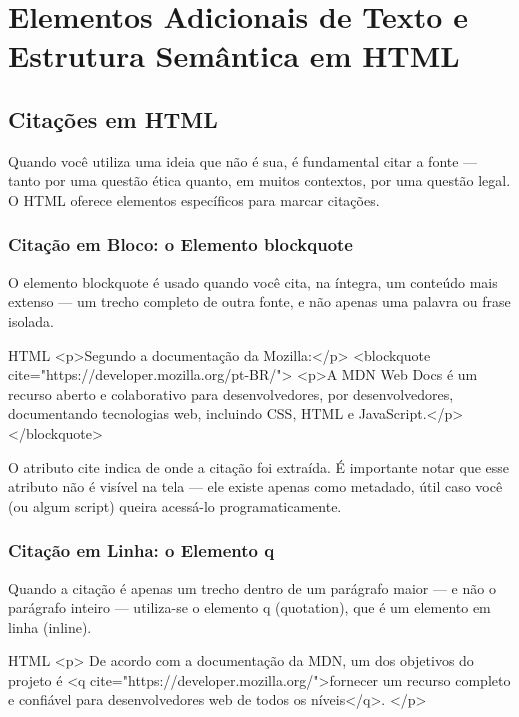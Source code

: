 \chapter{Elementos Adicionais de Texto e Estrutura Semântica em HTML}

\section{Citações em HTML}

Quando você utiliza uma ideia que não é sua, é fundamental citar a fonte — tanto por uma questão ética quanto, em muitos contextos, por uma questão legal. O HTML oferece elementos específicos para marcar citações.

\subsection{Citação em Bloco: o Elemento blockquote}

O elemento blockquote é usado quando você cita, na íntegra, um conteúdo mais extenso — um trecho completo de outra fonte, e não apenas uma palavra ou frase isolada.

\begin{codebox}{HTML}
 <p>Segundo a documentação da Mozilla:</p>
 <blockquote cite="https://developer.mozilla.org/pt-BR/">
   <p>A MDN Web Docs é um recurso aberto e colaborativo para
      desenvolvedores, por desenvolvedores, documentando tecnologias
      web, incluindo CSS, HTML e JavaScript.</p>
 </blockquote>
\end{codebox}

O atributo cite indica de onde a citação foi extraída. É importante notar que esse atributo não é visível na tela — ele existe apenas como metadado, útil caso você (ou algum script) queira acessá-lo programaticamente.

\subsection{Citação em Linha: o Elemento q}

Quando a citação é apenas um trecho dentro de um parágrafo maior — e não o parágrafo inteiro — utiliza-se o elemento q (quotation), que é um elemento em linha (inline).

\begin{codebox}{HTML}
<p>
  De acordo com a documentação da MDN, um dos objetivos do projeto é
  <q cite="https://developer.mozilla.org/">fornecer um recurso completo
  e confiável para desenvolvedores web de todos os níveis</q>.
</p>
\end{codebox}

